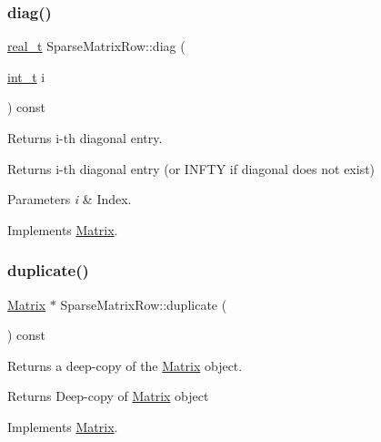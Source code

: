 \subsubsection{\texorpdfstring{diag()}{diag()}}
{\footnotesize\ttfamily \hyperlink{qp_o_a_s_e_s__wrapper_8h_a0d00e2b3dfadee81331bbb39068570c4}{real\+\_\+t} Sparse\+Matrix\+Row\+::diag (\begin{DoxyParamCaption}\item[{\hyperlink{_types_8hpp_ab6fd6105e64ed14a0c9281326f05e623}{int\+\_\+t}}]{i }\end{DoxyParamCaption}) const\hspace{0.3cm}{\ttfamily [virtual]}}

Returns i-\/th diagonal entry. \begin{DoxyReturn}{Returns}
i-\/th diagonal entry (or I\+N\+F\+TY if diagonal does not exist) 
\end{DoxyReturn}

\begin{DoxyParams}{Parameters}
{\em i} & Index. \\
\hline
\end{DoxyParams}


Implements \hyperlink{class_matrix_a8d76d428884fdb7a3deade8cad3c4b0a}{Matrix}.

\mbox{\label{class_sparse_matrix_row_a2a74a4b97da1de2e8bd59ddd342afbba}} 
\subsubsection{\texorpdfstring{duplicate()}{duplicate()}}
{\footnotesize\ttfamily \hyperlink{class_matrix}{Matrix} $\ast$ Sparse\+Matrix\+Row\+::duplicate (\begin{DoxyParamCaption}{ }\end{DoxyParamCaption}) const\hspace{0.3cm}{\ttfamily [virtual]}}

Returns a deep-\/copy of the \hyperlink{class_matrix}{Matrix} object. \begin{DoxyReturn}{Returns}
Deep-\/copy of \hyperlink{class_matrix}{Matrix} object 
\end{DoxyReturn}


Implements \hyperlink{class_matrix_abf41d80f7392e9d63e9b2fa4b822d3b9}{Matrix}.

